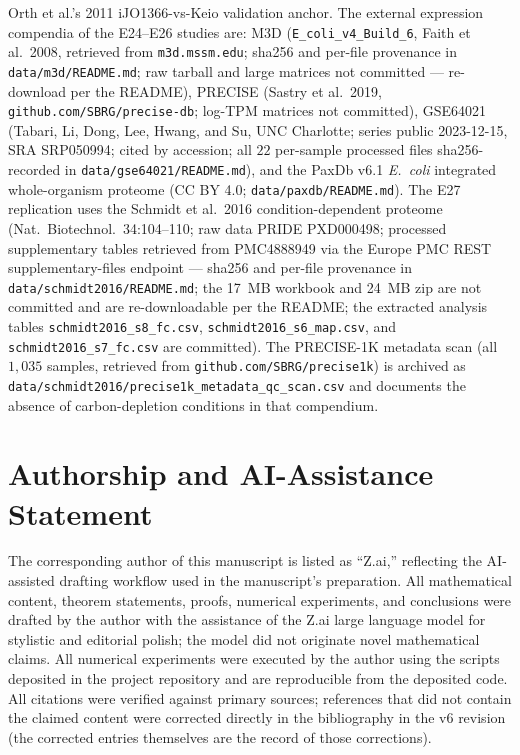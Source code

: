 \documentclass[11pt,a4paper]{article}
\theoremstyle{plain}
\theoremstyle{definition}
\theoremstyle{remark}
\begin{document}
\begin{itemize}
  Orth et al.'s 2011 iJO1366-vs-Keio validation anchor. The external
  expression compendia of the E24--E26 studies are: M3D
  (\texttt{E\_coli\_v4\_Build\_6}, Faith et al.\ 2008, retrieved
  from \texttt{m3d.mssm.edu}; sha256 and per-file provenance in
  \texttt{data/m3d/README.md}; raw tarball and large matrices not
  committed --- re-download per the README), PRECISE (Sastry et al.\
  2019, \texttt{github.com/SBRG/precise-db}; log-TPM matrices not
  committed), GSE64021 (Tabari, Li, Dong, Lee, Hwang, and Su, UNC
  Charlotte; series public 2023-12-15, SRA SRP050994; cited by
  accession; all $22$ per-sample processed files sha256-recorded in
  \texttt{data/gse64021/README.md}), and the PaxDb v6.1
  \emph{E.~coli} integrated whole-organism proteome (CC BY 4.0;
  \texttt{data/paxdb/README.md}). The E27 replication uses the
  Schmidt et al.\ 2016 condition-dependent proteome (Nat.\
  Biotechnol.\ 34:104--110; raw data PRIDE PXD000498; processed
  supplementary tables retrieved from PMC4888949 via the Europe
  PMC REST supplementary-files endpoint --- sha256 and per-file
  provenance in \texttt{data/schmidt2016/README.md}; the 17~MB
  workbook and 24~MB zip are not committed and are re-downloadable
  per the README; the extracted analysis tables
  \texttt{schmidt2016\_s8\_fc.csv}, \texttt{schmidt2016\_s6\_map.csv},
  and \texttt{schmidt2016\_s7\_fc.csv} are committed). The
  PRECISE-1K metadata scan (all $1{,}035$ samples, retrieved from
  \texttt{github.com/SBRG/precise1k}) is archived as
  \texttt{data/schmidt2016/precise1k\_metadata\_qc\_scan.csv} and
  documents the absence of carbon-depletion conditions in that
  compendium.
\end{itemize}

\section*{Authorship and AI-Assistance Statement}
\label{sec:authorship}

The corresponding author of this manuscript is listed as ``Z.ai,''
reflecting the AI-assisted drafting workflow used in the manuscript's
preparation. All mathematical content, theorem statements, proofs,
numerical experiments, and conclusions were drafted by the author with
the assistance of the Z.ai large language model for stylistic and
editorial polish; the model did not originate novel mathematical
claims. All numerical experiments were executed by the author using
the scripts deposited in the project repository and are reproducible
from the deposited code. All citations were verified against primary
sources; references that did not contain the claimed content were
corrected directly in the bibliography in the v6 revision (the
corrected entries themselves are the record of those corrections).
\end{document}
